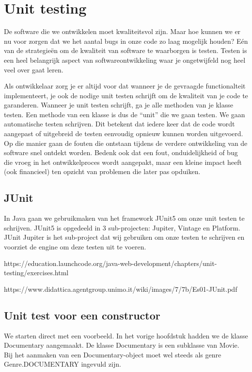 \chapter{Unit testing}

\begin{summary}
De software die we ontwikkelen moet kwaliteitsvol zijn. Maar hoe kunnen we er nu voor zorgen dat we het aantal bugs in onze code zo laag mogelijk houden? E\'en van de strategie\"en om de kwaliteit van software te waarborgen is testen. Testen is een heel belangrijk aspect van softwareontwikkeling waar je ongetwijfeld nog heel veel over gaat leren. 

Als ontwikkelaar zorg je er altijd voor dat wanneer je de gevraagde functionalteit implementeert, je ook de nodige unit testen schrijft om de kwaliteit van je code te garanderen. Wanneer je unit testen schrijft, ga je alle methoden van je klasse testen. Een methode van een klasse is dus de ``unit'' die we gaan testen.
We gaan automatische testen schrijven. Dit betekent dat iedere keer dat de code wordt aangepast of uitgebreid de testen eenvoudig opnieuw kunnen worden uitgevoerd. Op die manier gaan de fouten die ontstaan tijdens de verdere ontwikkeling van de software snel ontdekt worden. Bedenk ook dat een fout, onduidelijkheid of bug die vroeg in het ontwikkelproces wordt aangepakt, maar een kleine impact heeft (ook financieel) ten opzicht van problemen die later pas opduiken.
\end{summary}

\section{JUnit}

In Java gaan we gebruikmaken van het framework JUnit5 om onze unit testen te schrijven.
JUnit5 is opgedeeld in 3 sub-projecten:  Jupiter, Vintage en Platform. JUnit Jupiter is het  sub-project dat wij gebruiken om onze testen te schrijven en voorziet de engine om deze testen uit te voeren.


https://education.launchcode.org/java-web-development/chapters/unit-testing/exercises.html

https://www.didattica.agentgroup.unimo.it/wiki/images/7/7b/Es01-JUnit.pdf

\section{Unit test voor een constructor}

We starten direct met een voorbeeld. In het vorige hoofdstuk hadden we de klasse Documentary aangemaakt. De klasse Documentary is een subklasse van Movie. Bij het aanmaken van een Documentary-object moet wel steeds als genre Genre.DOCUMENTARY ingevuld zijn. 

